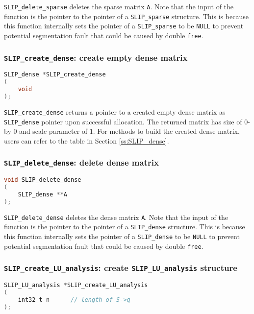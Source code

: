 \documentclass[11pt]{article}
\theoremstyle{definition}
\begin{document}
\verb|SLIP_delete_sparse| deletes the sparse matrix \verb|A|. Note that the input of the function is the pointer to the pointer of a \verb|SLIP_sparse| structure. This is because this function internally sets the pointer of a \verb|SLIP_sparse| to be \verb|NULL| to prevent potential segmentation fault that could be caused by double \verb|free|.

\cprotect\subsubsection{\verb|SLIP_create_dense|: create empty dense matrix}\label{ss:create_dense}
\begin{lstlisting}[language=C,frame=single]
SLIP_dense *SLIP_create_dense
(
    void
);
\end{lstlisting}

\verb|SLIP_create_dense| returns a pointer to a created empty dense matrix as \verb|SLIP_dense| pointer upon successful allocation. The returned matrix has size of $0$-by-$0$ and scale parameter of $1$. For methods to build the created dense matrix, users can refer to the table in Section \ref{ss:SLIP_dense}.

\cprotect\subsubsection{\verb|SLIP_delete_dense|: delete dense matrix}\label{ss:delete_dense}
\begin{lstlisting}[language=C,frame=single]
void SLIP_delete_dense
(
    SLIP_dense **A
);
\end{lstlisting}

\verb|SLIP_delete_dense| deletes the dense matrix \verb|A|. Note that the input of the function is the pointer to the pointer of a \verb|SLIP_dense| structure. This is because this function internally sets the pointer of a \verb|SLIP_dense| to be \verb|NULL| to prevent potential segmentation fault that could be caused by double \verb|free|.

\cprotect\subsubsection{\verb|SLIP_create_LU_analysis|: create \verb|SLIP_LU_analysis| structure}\label{ss:create_LU_analysis}
\begin{lstlisting}[language=C,frame=single]
SLIP_LU_analysis *SLIP_create_LU_analysis
(
    int32_t n      // length of S->q
);
\end{lstlisting}
\end{document}
